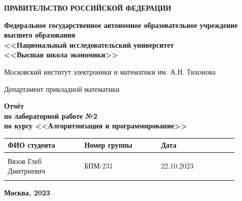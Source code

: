 \documentclass[12pt]{article}
\begin{document}
\thispagestyle{empty}
\begin{center}
\textbf{ПРАВИТЕЛЬСТВО РОССИЙСКОЙ ФЕДЕРАЦИИ}

\vspace{5ex}
	
\textbf{Федеральное государственное автономное образовательное учреждение \\ высшего образования \\ <<Национальный исследовательский университет \\ <<Высшая школа экономики>>}
\end{center}
\vspace{5ex}

\begin{center}
    Московский институт электроники и математики им. А.Н. Тихонова  
    
    \vspace{5ex}
    
    Департамент прикладной математики
    
    \vspace{10ex}
    \textbf{Отчёт \\ по лабораторной работе №2 \\ по курсу <<Алгоритмизация и программирование>>}
	\vspace{7ex}

\end{center}

\begin{center} 
\begin{tabular}{| p{0.3\linewidth}| p{0.3\linewidth}| p{0.3\linewidth}|}
 \hline	
ФИО студента & Номер группы & Дата \\  \hline
 & & \\  
Вязов Глеб \newline Дмитриевич & БПМ-231 & 22.10.2023\\  
 & & \\  \hline		
\end{tabular}
\end{center}

\begin{center}
	\vspace{3ex}
	
	\vfill
   
   \normalsize
    
	\textbf{Москва, 2023}
\end{center}

\newpage

\end{document}
